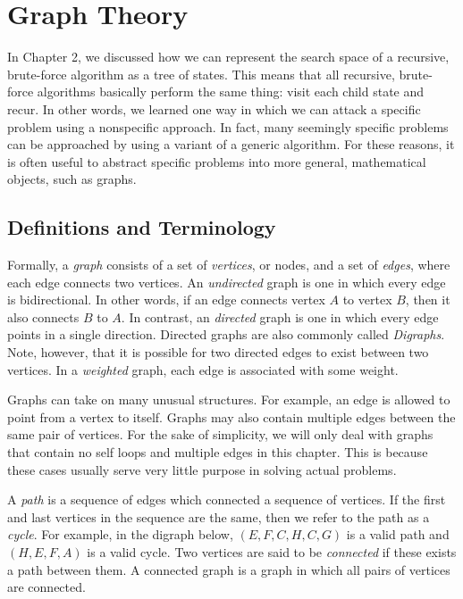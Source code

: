\chapter{Graph Theory}

In Chapter 2, we discussed how we can represent the search space of a recursive, brute-force algorithm as a tree of states. This means that all recursive, brute-force algorithms basically perform the same thing: visit each child state and recur. In other words, we learned one way in which we can attack a specific problem using a nonspecific approach. In fact, many seemingly specific problems can be approached by using a variant of a generic algorithm. For these reasons, it is often useful to abstract specific problems into more general, mathematical objects, such as graphs. 


\section{Definitions and Terminology}

Formally, a \textit{graph} consists of a set of \textit{vertices}, or nodes, and a set of \textit{edges}, where each edge connects two vertices. An \textit{undirected} graph is one in which every edge is bidirectional. In other words, if an edge connects vertex $A$ to vertex $B$, then it also connects $B$ to $A$. In contrast, an \textit{directed} graph is one in which every edge points in a single direction. Directed graphs are also commonly called \textit{Digraphs}. Note, however, that it is possible for two directed edges to exist between two vertices. In a \textit{weighted} graph, each edge is associated with some weight. 

Graphs can take on many unusual structures. For example, an edge is allowed to point from a vertex to itself. Graphs may also contain multiple edges between the same pair of vertices. For the sake of simplicity, we will only deal with graphs that contain no self loops and multiple edges in this chapter. This is because these cases usually serve very little purpose in solving actual problems. 

A \textit{path} is a sequence of edges which connected a sequence of vertices.  If the first and last vertices in the sequence are the same, then we refer to the path as a \textit{cycle}. For example, in the digraph below, $(E, F, C, H, C, G)$ is a valid path and $(H, E, F, A)$ is a valid cycle. Two vertices are said to be \textit{connected} if these exists a path between them. A connected graph is a graph in which all pairs of vertices are connected. 

